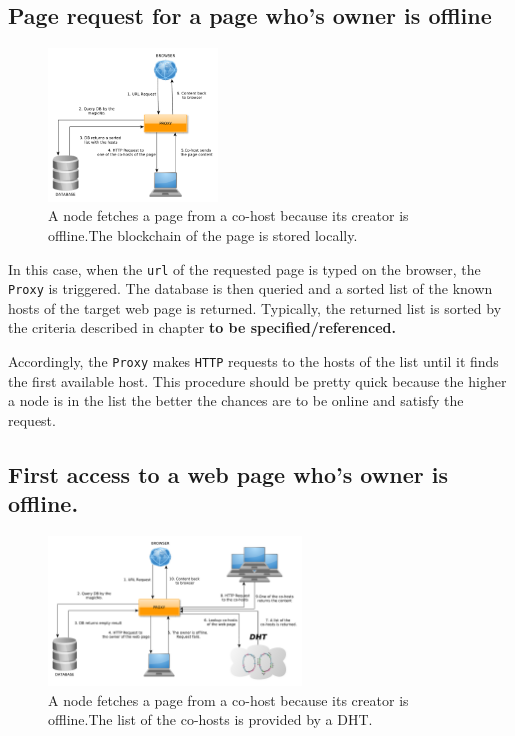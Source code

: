 \subsection{Page request for a page who's owner is offline}

\begin{figure}[htp]
\center
\includegraphics[width=0.4\textwidth]{pictures/fetch_page_offline_creator.pdf}
\caption{A node fetches a page from a co-host because its creator is offline.The
blockchain of the page is stored locally.}
\label{fig:offline_creator}
\end{figure}

In this case, when the \texttt{url} of the requested page is typed on the
browser, the \texttt{Proxy} is triggered. The database is then queried and
a sorted list of the known hosts of the target web page is returned. Typically,
the returned list is sorted by the criteria described in chapter
\textbf{to be specified/referenced.}

Accordingly, the \texttt{Proxy} makes \texttt{HTTP} requests to the hosts of
the list until it finds the first available host. This procedure should be
pretty quick because the higher a node is in the list the better the chances
are to be online and satisfy the request.


\subsection{First access to a web page who's owner is offline.}

\begin{figure}[htp]
\center
\includegraphics[width=0.6\textwidth]{pictures/fetch_page_offline_creator_no_blockchain_stored.pdf}
\caption{A node fetches a page from a co-host because its creator is offline.The list of
the co-hosts is provided by a DHT.}
\label{fig:offline_creator}
\end{figure}


